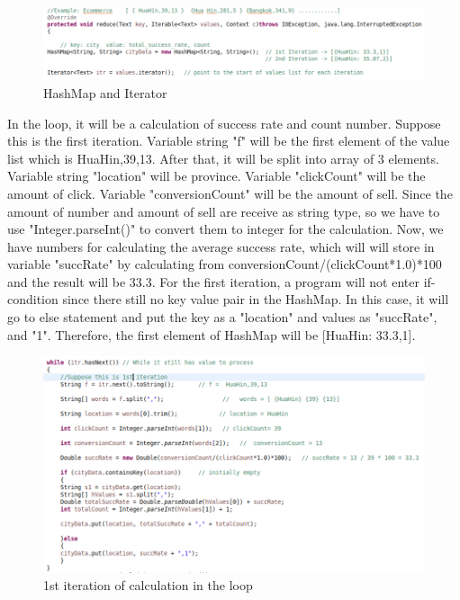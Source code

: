 \documentclass[11pt]{article}
\begin{document}
\begin{figure}[h]
\centering
\includegraphics[scale=0.7]{code3}
\caption{HashMap and Iterator}
\end{figure}


\newpage
In the loop, it will be a calculation of success rate and count number. Suppose this is the first iteration. Variable string "f" will be the first element of the value list which is HuaHin,39,13. After that, it will be split into array of 3 elements. Variable string "location" will be province. Variable "clickCount" will be the amount of click. Variable "conversionCount" will be the amount of sell. Since the amount of number and amount of sell are receive as string type, so we have to use "Integer.parseInt()" to convert them to integer for the calculation. Now, we have numbers for calculating the average success rate, which will will store in variable "succRate" by calculating from conversionCount/(clickCount*1.0)*100 and the result will be 33.3. For the first iteration, a program will not enter if-condition since there still no key value pair in the HashMap. In this case, it will go to else statement and put the key as a "location" and values as "succRate", and "1".
Therefore, the first element of HashMap will be [{HuaHin: 33.3,1}].\\[0.5 cm]

\begin{figure}[h]
\centering
\includegraphics[scale=0.7]{code4}
\caption{1st iteration of calculation in the loop}
\end{figure}
\end{document}
